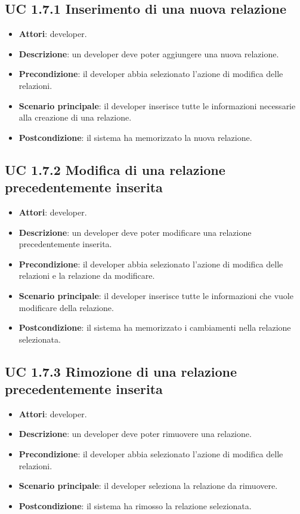 	\subsection{UC 1.7.1 Inserimento di una nuova relazione}
		\label{subsec:XEUC1.7.1}
		
		\begin{itemize}
			\item\textbf{Attori}: developer.
			\item\textbf{Descrizione}: un developer deve poter aggiungere una nuova relazione.
			\item\textbf{Precondizione}: il developer abbia selezionato l'azione di modifica delle relazioni.
			\item\textbf{Scenario principale}: il developer inserisce tutte le informazioni necessarie alla creazione di una relazione.
			\item\textbf{Postcondizione}: il sistema ha memorizzato la nuova relazione.
		\end{itemize}
		
	\subsection{UC 1.7.2 Modifica di una relazione precedentemente inserita}
		\label{subsec:XEUC1.7.2}
		
		\begin{itemize}
			\item\textbf{Attori}: developer.
			\item\textbf{Descrizione}: un developer deve poter modificare una relazione precedentemente inserita.
			\item\textbf{Precondizione}: il developer abbia selezionato l'azione di modifica delle relazioni e la relazione da modificare.
			\item\textbf{Scenario principale}: il developer inserisce tutte le informazioni che vuole modificare della relazione.
			\item\textbf{Postcondizione}: il sistema ha memorizzato i cambiamenti nella relazione selezionata.
		\end{itemize}
		
	\subsection{UC 1.7.3 Rimozione di una relazione precedentemente inserita}
		\label{subsec:XEUC1.7.3}
		
		\begin{itemize}
			\item\textbf{Attori}: developer.
			\item\textbf{Descrizione}: un developer deve poter rimuovere una relazione.
			\item\textbf{Precondizione}: il developer abbia selezionato l'azione di modifica delle relazioni.
			\item\textbf{Scenario principale}: il developer seleziona la relazione da rimuovere.
			\item\textbf{Postcondizione}: il sistema ha rimosso la relazione selezionata.
		\end{itemize}
		
